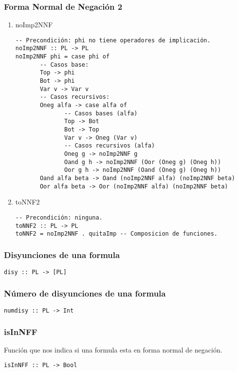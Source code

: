 \documentclass[11pt]{article}
\begin{document}
\subsubsection{Forma Normal de Negación 2}
\label{sec:orgda8afbe}
\begin{enumerate}
\item noImp2NNF
\label{sec:org82b4a30}
\begin{verbatim}
-- Precondición: phi no tiene operadores de implicación.
noImp2NNF :: PL -> PL
noImp2NNF phi = case phi of
       -- Casos base:
       Top -> phi
       Bot -> phi
       Var v -> Var v
       -- Casos recursivos:
       Oneg alfa -> case alfa of
              -- Casos bases (alfa)
              Top -> Bot
              Bot -> Top
              Var v -> Oneg (Var v)
              -- Casos recursivos (alfa)
              Oneg g -> noImp2NNF g
              Oand g h -> noImp2NNF (Oor (Oneg g) (Oneg h))
              Oor g h -> noImp2NNF (Oand (Oneg g) (Oneg h))
       Oand alfa beta -> Oand (noImp2NNF alfa) (noImp2NNF beta)
       Oor alfa beta -> Oor (noImp2NNF alfa) (noImp2NNF beta)
\end{verbatim}
\item toNNF2
\label{sec:org1cbac28}
\begin{verbatim}
-- Precondición: ninguna.
toNNF2 :: PL -> PL
toNNF2 = noImp2NNF . quitaImp -- Composicion de funciones.
\end{verbatim}
\end{enumerate}
\subsubsection{Disyunciones de una formula}
\label{sec:orge648da7}
\begin{verbatim}
disy :: PL -> [PL]
\end{verbatim}
\subsubsection{Número de disyunciones de una formula}
\label{sec:org09a0b8f}
\begin{verbatim}
numdisy :: PL -> Int
\end{verbatim}
\subsubsection{isInNFF}
\label{sec:orga427c01}
Función que nos indica si una formula esta en forma normal de negación.
\begin{verbatim}
isInNFF :: PL -> Bool
\end{verbatim}
\end{document}
